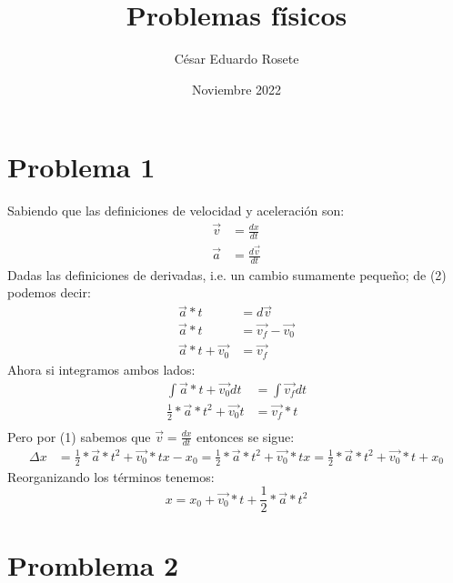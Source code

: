 \documentclass[letterpaper,12pt]{article}
\title{Problemas físicos}
\author{César Eduardo Rosete}
\date{Noviembre 2022}
\begin{document}
\maketitle
\lhead{\leftmark}
\rhead{\thepage}
\lfoot{\leftmark}
\rfoot{\thepage}
\section*{Problema 1}
Sabiendo que las definiciones de velocidad y aceleración son:
\begin{align}
    \Vec{v}&=\frac{dx}{dt}\\
    \Vec{a}&=\frac{d\Vec{v}}{dt}
\end{align}
Dadas las definiciones de derivadas, i.e. un cambio sumamente pequeño; de (2) podemos decir:
\begin{align*}
    \Vec{a}*t&=d\Vec{v}\\
    \Vec{a}*t&=\Vec{v_f}-\Vec{v_0}\\
    \Vec{a}*t+\Vec{v_0}&=\Vec{v_f}
\end{align*}
Ahora si integramos ambos lados:
\begin{align*}
    \int \Vec{a}*t+\Vec{v_0} dt&=\int \Vec{v_f}dt\\
    \frac{1}{2}*\Vec{a}*t^2+\Vec{v_0}t &=\Vec{v_f}*t\\
\end{align*}
Pero por (1) sabemos que $\Vec{v}=\frac{dx}{dt}$ entonces se sigue:
\begin{align*}
    \Delta x&=\frac{1}{2}*\Vec{a}*t^2+\Vec{v_0}*t 
    x-x_0=\frac{1}{2}*\Vec{a}*t^2+\Vec{v_0}*t 
    x=\frac{1}{2}*\Vec{a}*t^2+\Vec{v_0}*t+x_0
\end{align*}
Reorganizando los términos tenemos:
\begin{equation}
    x=x_0+\Vec{v_0}*t+\frac{1}{2}*\Vec{a}*t^2
\end{equation}
\section*{Promblema 2}
\end{document}
